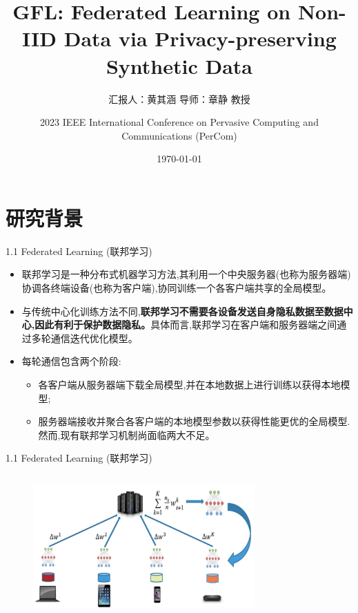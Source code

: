 \documentclass{sintefbeamer}
\title{\huge GFL: Federated Learning on Non-IID Data via Privacy-preserving Synthetic Data}
\subtitle{汇报人：黄其涵 \qquad 导师：章静 教授 \qquad }
\author{2023 IEEE International Conference on Pervasive Computing and Communications (PerCom)}
\date{\today}
\theoremstyle{definition}
\begin{document}
\maketitle


\section{研究背景}

\begin{frame}{1.1 Federated Learning (联邦学习)}
\begin{itemize}
\item 联邦学习是一种分布式机器学习方法,其利用一个中央服务器(也称为服务器端)协调各终端设备(也称为客户端),协同训练一个各客户端共享的全局模型。

\item 与传统中心化训练方法不同,\textbf{联邦学习不需要各设备发送自身隐私数据至数据中心,因此有利于保护数据隐私。}具体而言,联邦学习在客户端和服务器端之间通过多轮通信迭代优化模型。
\item 每轮通信包含两个阶段:
\begin{itemize}
\item[(1)]各客户端从服务器端下载全局模型,并在本地数据上进行训练以获得本地模型;
\item[(2)]服务器端接收并聚合各客户端的本地模型参数以获得性能更优的全局模型.然而,现有联邦学习机制尚面临两大不足。
\end{itemize}
\end{itemize}
\end{frame}



\begin{frame}{1.1 Federated Learning (联邦学习)}

\begin{columns}
\begin{column}{1\textwidth}
\begin{figure}[ht]
\centering
\includegraphics[width=0.8\textwidth]{images/fl_arch}
\end{figure}
\end{column}
\begin{column}{0.\textwidth}
\end{column}
\end{columns}
\end{frame}
\end{document}
